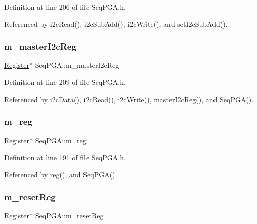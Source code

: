 Definition at line 206 of file Seq\+P\+G\+A.\+h.



Referenced by i2c\+Read(), i2c\+Sub\+Add(), i2c\+Write(), and set\+I2c\+Sub\+Add().

\mbox{\label{classSeqPGA_a942c71b33a4f43b7a994cb9216abb17e}} 
\subsubsection{\texorpdfstring{m\+\_\+master\+I2c\+Reg}{m\_masterI2cReg}}
{\footnotesize\ttfamily \hyperlink{classRegister}{Register}$\ast$ Seq\+P\+G\+A\+::m\+\_\+master\+I2c\+Reg\hspace{0.3cm}{\ttfamily [private]}}



Definition at line 209 of file Seq\+P\+G\+A.\+h.



Referenced by i2c\+Data(), i2c\+Read(), i2c\+Write(), master\+I2c\+Reg(), and Seq\+P\+G\+A().

\mbox{\label{classSeqPGA_afd827f1d3d55b0a8efafbd79a8c54a52}} 
\subsubsection{\texorpdfstring{m\+\_\+reg}{m\_reg}}
{\footnotesize\ttfamily \hyperlink{classRegister}{Register}$\ast$ Seq\+P\+G\+A\+::m\+\_\+reg\hspace{0.3cm}{\ttfamily [private]}}



Definition at line 191 of file Seq\+P\+G\+A.\+h.



Referenced by reg(), and Seq\+P\+G\+A().

\mbox{\label{classSeqPGA_a8c519e98b992ab872622e95dae4461d8}} 
\subsubsection{\texorpdfstring{m\+\_\+reset\+Reg}{m\_resetReg}}
{\footnotesize\ttfamily \hyperlink{classRegister}{Register}$\ast$ Seq\+P\+G\+A\+::m\+\_\+reset\+Reg\hspace{0.3cm}{\ttfamily [private]}}



